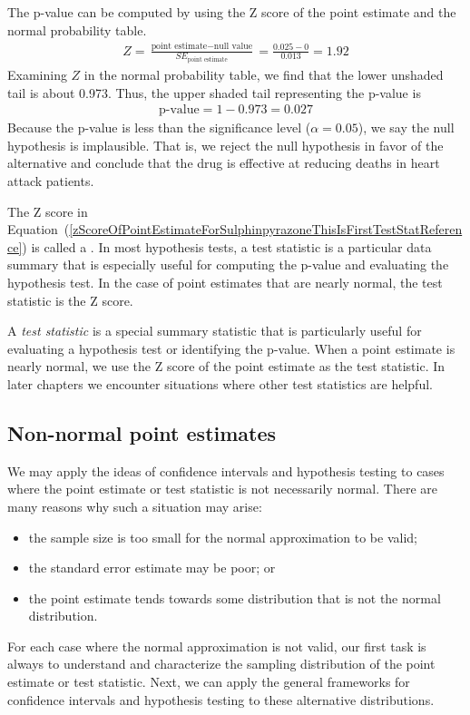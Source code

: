 \begin{example}
The p-value can be computed by using the Z score of the point estimate and the normal probability table.
\begin{eqnarray}
Z = \frac{\text{point estimate} - \text{null value}}{SE_{\text{point estimate}}}
	= \frac{0.025 - 0}{0.013} = 1.92
\label{zScoreOfPointEstimateForSulphinpyrazoneThisIsFirstTestStatReference}
\end{eqnarray}
Examining $Z$ in the normal probability table, we find that the lower unshaded tail is about 0.973. Thus, the upper shaded tail representing the p-value is
\begin{eqnarray*}
\text{p-value} = 1-0.973 = 0.027
\end{eqnarray*}
Because the p-value is less than the significance level ($\alpha=0.05$), we say the null hypothesis is implausible. That is, we reject the null hypothesis in favor of the alternative and conclude that the drug is effective at reducing deaths in heart attack patients.
\end{example}

The Z score in Equation~(\ref{zScoreOfPointEstimateForSulphinpyrazoneThisIsFirstTestStatReference}) is called a . In most hypothesis tests, a test statistic is a particular data summary that is especially useful for computing the p-value and evaluating the hypothesis test. In the case of point estimates that are nearly normal, the test statistic is the Z score.

\begin{termBox}{
A \emph{test statistic} is a special summary statistic that is particularly useful for evaluating a hypothesis test or identifying the p-value. When a point estimate is nearly normal, we use the Z score of the point estimate as the test statistic. In later chapters we encounter situations where other test statistics are helpful.}
\end{termBox}


\subsection{Non-normal point estimates}

We may apply the ideas of confidence intervals and hypothesis testing to cases where the point estimate or test statistic is not necessarily normal. There are many reasons why such a situation may arise:
\begin{itemize}
\setlength{\itemsep}{0mm}
\item the sample size is too small for the normal approximation to be valid;
\item the standard error estimate may be poor; or
\item the point estimate tends towards some distribution that is not the normal distribution.
\end{itemize}
For each case where the normal approximation is not valid, our first task is always to understand and characterize the sampling distribution of the point estimate or test statistic. Next, we can apply the general frameworks for confidence intervals and hypothesis testing to these alternative distributions.


